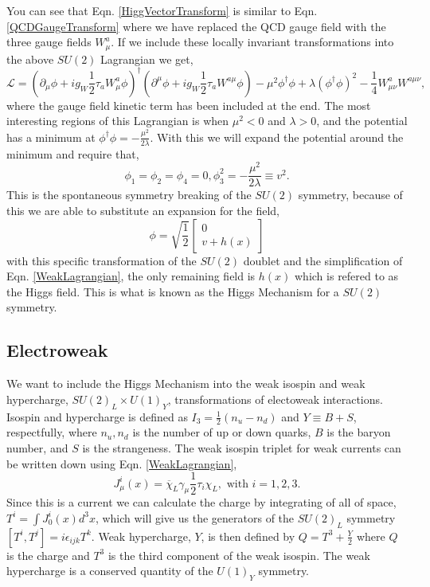 You can see that Eqn. \ref{HiggVectorTransform} is similar to Eqn. \ref{QCDGaugeTransform} where we have replaced the QCD gauge field with the three gauge fields $W_\mu^a$. If we include these locally invariant transformations into the above $SU(2)$ Lagrangian we get,
\begin{equation}\label{WeakLagrangian}
\mathcal{L}=(\partial_\mu\phi+ig_W\frac{1}{2}\tau_{a}W^{a}_\mu\phi)^\dagger(\partial^\mu\phi+ig_W\frac{1}{2}\tau_{a}W^{a\mu}\phi)-\mu^2\phi^\dagger\phi+\lambda(\phi^\dagger\phi)^2-\frac{1}{4}W^{a}_{\mu\nu}W^{a\mu\nu},
\end{equation}
where the gauge field kinetic term has been included at the end. The most interesting regions of this Lagrangian is when $\mu^2<0$ and $\lambda>0$, and the potential has a minimum at $\phi^\dagger\phi=-\frac{\mu^2}{2\lambda}$. With this we will expand the potential around the minimum and require that,
\begin{equation}
\phi_1=\phi_2=\phi_4=0, \phi_3^2=-\frac{\mu^2}{2\lambda}\equiv v^2.
\end{equation}
This is the spontaneous symmetry breaking of the $SU(2)$ symmetry, because of this we are able to substitute an expansion for the field,
\begin{equation}
\phi=\sqrt{\frac{1}{2}}
\begin{bmatrix}
0 \\
v+h(x)
\end{bmatrix}
\end{equation}
with this specific transformation of the $SU(2)$ doublet and the simplification of Eqn. \ref{WeakLagrangian}, the only remaining field is $h(x)$ which is refered to as the Higgs field. This is what is known as the Higgs Mechanism for a $SU(2)$ symmetry. 

\subsection{Electroweak} \label{EMWeak}

We want to include the Higgs Mechanism into the weak isospin and weak hypercharge, $SU(2)_L\times U(1)_Y$, transformations of electoweak interactions. Isospin and hypercharge is defined as $I_3=\frac{1}{2}(n_u-n_d)$ and $Y\equiv B+S$, respectfully, where $n_u,n_d$ is the number of up or down quarks, $B$ is the baryon number, and $S$ is the strangeness. The weak isospin triplet for weak currents can be written down using Eqn. \ref{WeakLagrangian}, 
\begin{equation}\label{WeakIsospinCurrent}
J_\mu^i(x)=\overline{\chi}_L\gamma_\mu\frac{1}{2}\tau_i\chi_L, \text{ with } i=1,2,3.
\end{equation}
Since this is a current we can calculate the charge by integrating of all of space, $T^i=\int J_0^i(x)d^3x$, which will give us the generators of the $SU(2)_L$ symmetry $[T^i,T^j]=i\epsilon_{ijk}T^k$. Weak hypercharge, $Y$, is then defined by $Q=T^3+\frac{Y}{2}$ where $Q$ is the charge and $T^3$ is the third component of the weak isospin. The weak hypercharge is a conserved quantity of the $U(1)_Y$ symmetry. 

